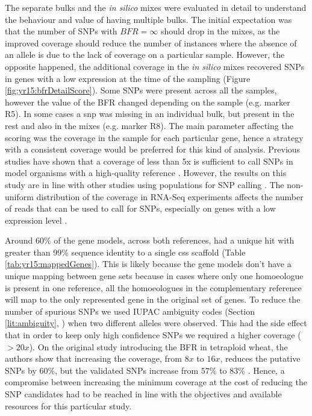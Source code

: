 The separate bulks and the \textit{in silico} mixes were evaluated in detail to understand the behaviour and value of having multiple bulks. 
The initial expectation was that the number of SNPs with $BFR=\infty$ should drop in the mixes, as the improved coverage should reduce the number of instances where the absence of an allele is due to the lack of coverage on a particular sample. 
However, the opposite happened, the additional coverage in the \textit{in silico} mixes recovered SNPs in genes with a low expression at the time of the sampling (Figure \ref{fig:yr15:bfrDetailScore}).  
Some SNPs were present across all the samples, however the value of the BFR changed depending on the sample (e.g. marker R5). 
In some cases a \gls{snp} was missing in an individual bulk, but present in the rest and also in the mixes (e.g. marker R8). 
The main parameter affecting the scoring was the coverage in the sample for each particular gene, hence a strategy with a consistent coverage would be preferred for this kind of analysis.  
Previous studies have shown that a coverage of less than 5x is sufficient to call SNPs in model organisms with a high-quality reference \citep{Schneeberger2011}.
However, the results on this study are in line with other studies using populations for SNP calling \citep{Abe2012,Takagi2013}. 
The non-uniform distribution of the coverage in RNA-Seq experiments affects the number of reads that can be used to call for SNPs, especially on genes with a low expression level \citep{Mortazavi2008}. 



Around $60\%$ of the gene models, across both references, had a unique hit with greater than 99\% sequence identity to a single \gls{css} scaffold (Table \ref{tab:yr15:mappedGenes}). 
This is likely because the gene models don't have a unique mapping between gene sets because in cases where only one homoeologue is present in one reference, all the homoeologues in the complementary reference will map to the only represented gene in the original set of genes. 
To reduce the number of spurious SNPs we used IUPAC ambiguity codes (Section \ref{lit:ambiguity}, \citet{Cornish-Bowden1985}) when two different alleles were observed.
This had the side effect that in order to keep only high confidence SNPs we required a higher coverage ($>20x$). 
On the original study introducing the BFR in tetraploid wheat, the authors show that increasing the coverage, from $8x$ to $16x$, reduces the putative SNPs by $60\%$, but the validated SNPs increase from $57\%$ to $83\%$ \citep{Trick2012}. 
Hence, a compromise between increasing the minimum coverage at the cost of reducing the SNP candidates had to be reached in line with the objectives and available resources for this particular study. 

